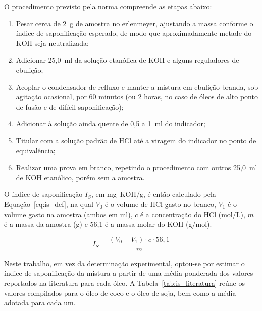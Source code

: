 O procedimento previsto pela norma compreende as etapas abaixo:

\begin{enumerate}
    \item Pesar cerca de 2~g de amostra no erlenmeyer, ajustando a massa conforme o índice de saponificação esperado, de modo que aproximadamente metade do KOH seja neutralizada;
    \item Adicionar 25,0~ml da solução etanólica de KOH e alguns reguladores de ebulição;
    \item Acoplar o condensador de refluxo e manter a mistura em ebulição branda, sob agitação ocasional, por 60 minutos (ou 2 horas, no caso de óleos de alto ponto de fusão e de difícil saponificação);
    \item Adicionar à solução ainda quente de 0,5 a 1~ml do indicador;
    \item Titular com a solução padrão de HCl até a viragem do indicador no ponto de equivalência;
    \item Realizar uma prova em branco, repetindo o procedimento com outros 25,0~ml de KOH etanólico, porém sem a amostra.
\end{enumerate}

O índice de saponificação $I_S$, em mg~KOH/g, é então calculado pela Equação~\ref{eq:is_def}, na qual $V_0$ é o volume de HCl gasto no branco, $V_1$ é o volume gasto na amostra (ambos em ml), $c$ é a concentração do HCl (mol/L), $m$ é a massa da amostra (g) e 56,1 é a massa molar do KOH (g/mol).

\begin{equation}
    I_S = \frac{(V_0 - V_1) \cdot c \cdot 56{,}1}{m}
    \label{eq:is_def}
\end{equation}

Neste trabalho, em vez da determinação experimental, optou-se por estimar o índice de saponificação da mistura a partir de uma média ponderada dos valores reportados na literatura para cada óleo. A Tabela~\ref{tab:is_literatura} reúne os valores compilados para o óleo de coco e o óleo de soja, bem como a média adotada para cada um.

